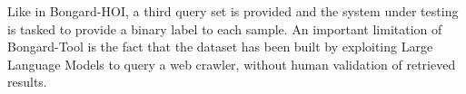 Like in Bongard-HOI, a third query set is provided and the system under testing is tasked to provide a binary label to each sample.
An important limitation of Bongard-Tool is the fact that the dataset has been built by exploiting Large Language Models to query a web crawler, without human validation of retrieved results.


